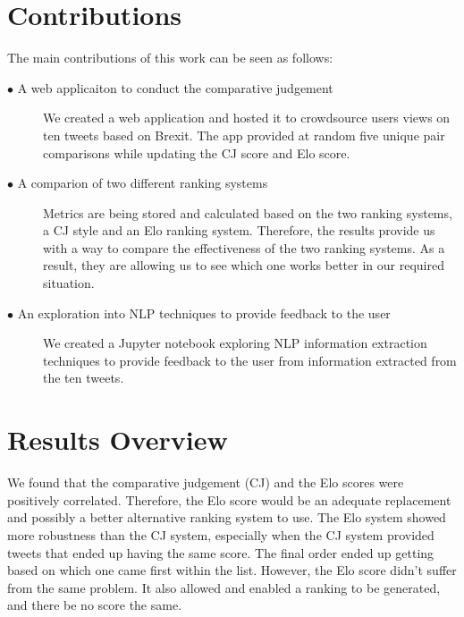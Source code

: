 	\section{Contributions} 
		\label{sec:intro_contribs} 

		The main contributions of this work can be seen as follows:

		\begin{description}	

			\item[\(\bullet\) A web applicaiton to conduct the comparative judgement]\hfill

			We created a web application and hosted it to crowdsource users views on ten tweets based on Brexit. The app provided at random five unique pair comparisons while updating the CJ score and Elo score. 

			\item[\(\bullet\) A comparion of two different ranking systems]\hfill

			Metrics are being stored and calculated based on the two ranking systems, a CJ style and an Elo ranking system. Therefore, the results provide us with a way to compare the effectiveness of the two ranking systems. As a result, they are allowing us to see which one works better in our required situation.

			\item[\(\bullet\) An exploration into NLP techniques to provide feedback to the user]\hfill

		We created a Jupyter notebook exploring NLP information extraction techniques to provide feedback to the user from information extracted from the ten tweets.

		\end{description}
	
	\section{Results Overview}
		We found that the comparative judgement (CJ) and the Elo scores were positively correlated. Therefore, the Elo score would be an adequate replacement and possibly a better alternative ranking system to use. The Elo system showed more robustness than the CJ system, especially when the CJ system provided tweets that ended up having the same score. The final order ended up getting based on which one came first within the list. However, the Elo score didn't suffer from the same problem. It also allowed and enabled a ranking to be generated, and there be no score the same.
		
